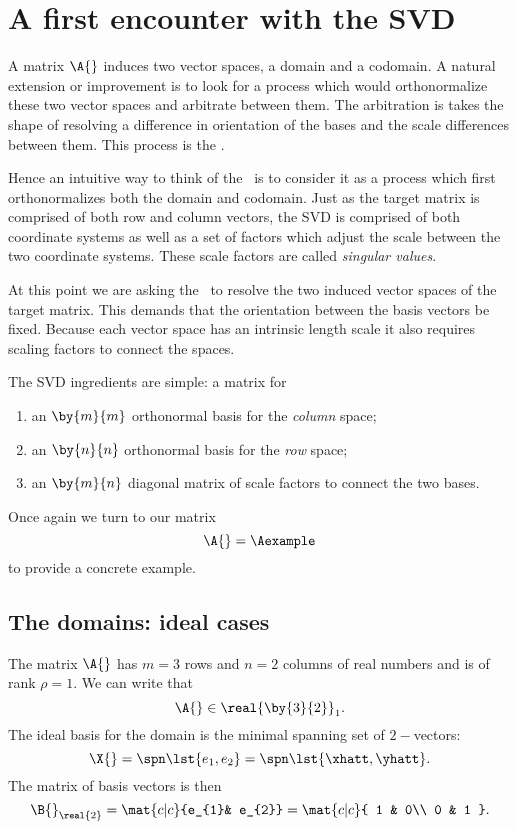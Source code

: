 \section{A first encounter with the SVD}
A matrix $\A{}$ induces two vector spaces, a domain and a codomain. A natural extension or improvement is to look for a process which would orthonormalize these two vector spaces and arbitrate between them. The arbitration is takes the shape of resolving a difference in orientation of the bases and the scale differences between them. This process is the \svdl.

Hence an intuitive way to think of the \svdl \ is to consider it as a process which first orthonormalizes both the domain and codomain. Just as the target matrix is comprised of both row and column vectors, the SVD is comprised of both coordinate systems as well as a set of factors which adjust the scale between the two coordinate systems. These scale factors are called \textit{singular values}.

At this point we are asking the \svdl \ to resolve the two induced vector spaces of  the target matrix. This demands that the orientation between the basis vectors be fixed. Because each vector space has an intrinsic length scale it also requires scaling factors to connect the spaces.

The SVD ingredients are simple: a matrix for 
\begin{enumerate}
\item an $\by{m}{m}$ orthonormal basis for the \textit{column} space;
\item an $\by{n}{n}$ orthonormal basis for the \textit{row} space;
\item an $\by{m}{n}$ diagonal matrix of scale factors to connect the two bases.
\end{enumerate}

Once again we turn to our matrix
\begin{equation*}
  \A{} = \Aexample
\end{equation*}
to provide a concrete example.

\subsection{The domains: ideal cases}
The matrix $\A{}$ has $m=3$ rows and $n=2$ columns of real numbers and is of rank $\rho=1$. We can write that
\begin{equation}
  \A{} \in \real{\by{3}{2}}_{1}.
\end{equation}
The ideal basis for the domain is the minimal spanning set of $2-$vectors:
\begin{equation}
  \X{} = \spn \lst{e_{1},e_{2}} = \spn \lst{\xhatt,\yhatt}.
\end{equation}
The matrix of basis vectors is then
\begin{equation}
  \B{}_{\real{2}} = \mat{c|c}{e_{1}& e_{2}} = \mat{c|c}
  {
  1 & 0\\
  0 & 1
  }.
\end{equation}

